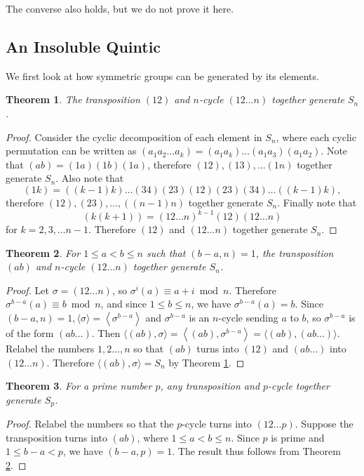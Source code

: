 \documentclass[12pt]{article}
\newtheorem{theorem}{Theorem}
\theoremstyle{definition}
\begin{document}
The converse also holds, but we do not prove it here.

\subsection{An Insoluble Quintic}
We first look at how symmetric groups can be generated by its elements. 

\begin{theorem} \label{thm:symmetric-12-12n}
    The transposition $(12)$ and $n$-cycle $(12 \dots n)$ together generate $S_n$. 
\end{theorem}
\begin{proof}
    Consider the cyclic decomposition of each element in $S_n$, where each cyclic permutation can be written as 
    $
    (a_1a_2\dots a_k) = (a_1 a_k) \dots (a_1 a_3) (a_1 a_2). 
    $
    Note that $(ab) = (1a)(1b)(1a)$, therefore $(12), (13), \ldots (1n)$ together generate $S_n$. Also note that  
    $$(1k)=((k-1)k)\dots(34)(23)(12)(23)(34)\dots((k-1)k),$$
    therefore $(12), (23), \dots, ((n-1)n)$ together generate $S_n$. Finally note that 
    $$
    (k(k+1)) = (12\dots n)^{k-1} (12) (12\dots n)
    $$
    for $k = 2, 3, \dots n - 1$. Therefore $(12)$ and $(12 \dots n)$ together generate $S_n$. 
\end{proof}

\begin{theorem} \label{thm:symmetric-ab-12n}
    For $1 \le a < b \le n$ such that $(b - a, n) = 1$, the transposition $(ab)$ and $n$-cycle $(12 \dots n)$ together generate $S_n$.
\end{theorem}
\begin{proof}
   Let $\sigma=(12 \ldots n)$, so $\sigma^i(a) \equiv a+i \bmod n$. Therefore $\sigma^{b-a}(a) \equiv b \bmod n$, and since $1 \le b \le n$, we have $\sigma^{b-a}(a)=b$. Since $(b-a, n)=1,\langle\sigma\rangle=\left\langle\sigma^{b-a}\right\rangle$ and $\sigma^{b-a}$ is an $n$-cycle sending $a$ to $b$, so $\sigma^{b-a}$ is of the form $(a b \ldots)$. Then
$
\langle(a b), \sigma\rangle=\left\langle(a b), \sigma^{b-a}\right\rangle=\langle(a b),(a b \ldots)\rangle .
$
Relabel the numbers $1,2 \ldots, n$ so that $(a b)$ turns into $(12)$ and $(a b \ldots)$ into $(12 \ldots n)$. Therefore $\langle(a b), \sigma\rangle=S_n$ by Theorem \ref{thm:symmetric-12-12n}.
\end{proof}

\begin{theorem} \label{thm:symmetric-prime}
    For a prime number $p$, any transposition and $p$-cycle together generate $S_p$.
\end{theorem}
\begin{proof}
    Relabel the numbers so that the $p$-cycle turns into $(12 \dots p)$. Suppose the transposition turns into $(ab)$, where $1 \le a < b \le n$. Since $p$ is prime and $1 \le b - a < p$, we have $(b - a, p) = 1$. The result thus follows from Theorem \ref{thm:symmetric-ab-12n}.
\end{proof}
\end{document}
